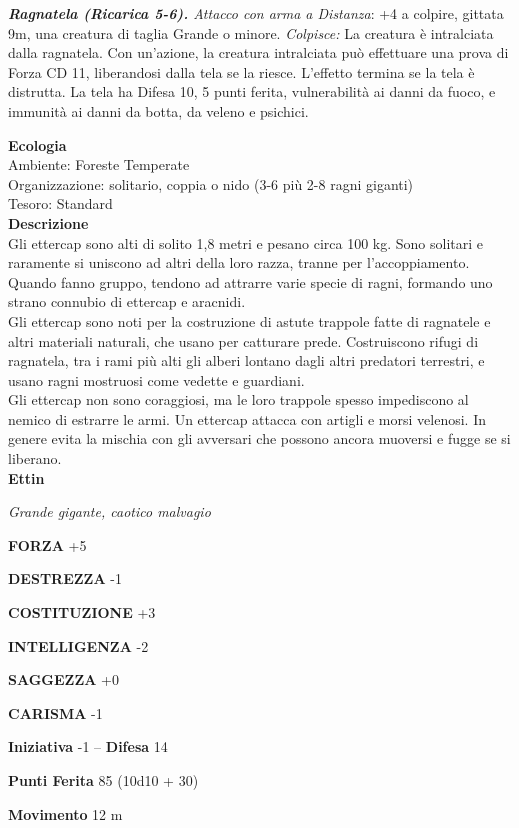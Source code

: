 \begin{multicols}{2}
\emph{\textbf{Ragnatela (Ricarica 5-6).} Attacco con arma a Distanza}: +4 a colpire, gittata 9m, una creatura di taglia Grande o minore. \emph{Colpisce:} La creatura è intralciata dalla ragnatela. Con un'azione, la creatura intralciata può effettuare una prova di Forza CD 11, liberandosi dalla tela se la riesce. L'effetto termina se la tela è distrutta. La tela ha Difesa 10, 5 punti ferita, vulnerabilità ai danni da fuoco, e immunità ai danni da botta, da veleno e psichici.

\textbf{Ecologia}\\
Ambiente: Foreste Temperate\\
Organizzazione: solitario, coppia o nido (3-6 più 2-8 ragni giganti)\\
Tesoro: Standard\\
\textbf{Descrizione}\\
Gli ettercap sono alti di solito 1,8 metri e pesano circa 100 kg. Sono solitari e raramente si uniscono ad altri della loro razza, tranne per l'accoppiamento. Quando fanno gruppo, tendono ad attrarre varie specie di ragni, formando uno strano connubio di ettercap e aracnidi.\\
Gli ettercap sono noti per la costruzione di astute trappole fatte di ragnatele e altri materiali naturali, che usano per catturare prede. Costruiscono rifugi di ragnatela, tra i rami più alti gli alberi lontano dagli altri predatori terrestri, e usano ragni mostruosi come vedette e guardiani.\\
Gli ettercap non sono coraggiosi, ma le loro trappole spesso impediscono al nemico di estrarre le armi. Un ettercap attacca con artigli e morsi velenosi. In genere evita la mischia con gli avversari che possono ancora muoversi e fugge se si liberano.\\


\medskip{}\textbf{Ettin}

\emph{Grande gigante, caotico malvagio}

\textbf{FORZA} +5

\textbf{DESTREZZA} -1

\textbf{COSTITUZIONE} +3

\textbf{INTELLIGENZA} -2

\textbf{SAGGEZZA} +0

\textbf{CARISMA} -1

\textbf{Iniziativa} -1 -- \textbf{Difesa} 14

\textbf{Punti Ferita} 85 (10d10 + 30)

\textbf{Movimento} 12 m


\end{multicols}
